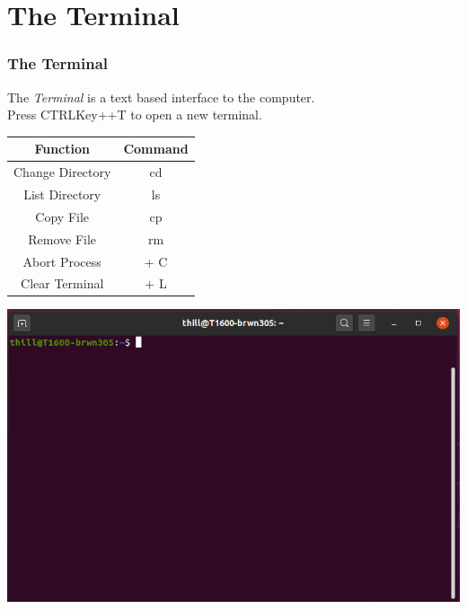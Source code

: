 \documentclass[fleqn]{beamer} %
\newcommand{\sectiontitleIV}{The Terminal}
\begin{document}
\section{\sectiontitleIV}	
	\begin{frame}[label=sectionIV] \small
		\frametitle{\sectiontitleIV}    
          The {\it Terminal} is a text based interface to the computer.\vspace{2mm}\\ Press CTRLKey+\ALTKey+T to open a new terminal. \vspace{3mm}\\      
                \begin{multicols}{2}
		
		\renewcommand{\arraystretch}{1.4}
		\begin{tabular}{|c|c|}\hline
				Function & Command \\ \hline
			 Change Directory & cd  \\ 
			List Directory & ls \\  
			Copy File& cp \\ 
			Remove File& rm  \\ 
			Abort Process& \CTRLKey + C  \\ 
			Clear Terminal& \CTRLKey + L  \\ \hline
				
		\end{tabular}
			
		\hspace{10mm}\includegraphics[scale=.20]{ubuntu_terminal.png}  
       	       
        \end{multicols}

       	                       
                
		\end{frame}
		
\end{document}
